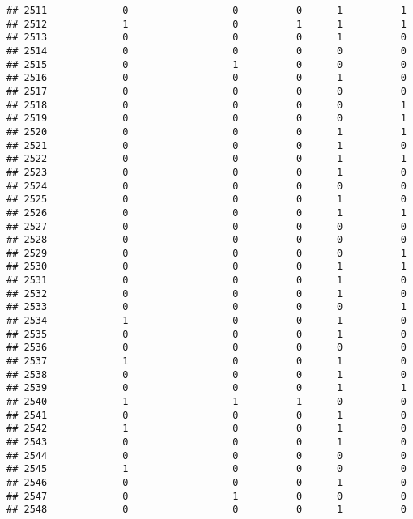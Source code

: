 \documentclass[
]{article}
\begin{document}
\begin{verbatim}
## 2511             0                  0          0      1          1
## 2512             1                  0          1      1          1
## 2513             0                  0          0      1          0
## 2514             0                  0          0      0          0
## 2515             0                  1          0      0          0
## 2516             0                  0          0      1          0
## 2517             0                  0          0      0          0
## 2518             0                  0          0      0          1
## 2519             0                  0          0      0          1
## 2520             0                  0          0      1          1
## 2521             0                  0          0      1          0
## 2522             0                  0          0      1          1
## 2523             0                  0          0      1          0
## 2524             0                  0          0      0          0
## 2525             0                  0          0      1          0
## 2526             0                  0          0      1          1
## 2527             0                  0          0      0          0
## 2528             0                  0          0      0          0
## 2529             0                  0          0      0          1
## 2530             0                  0          0      1          1
## 2531             0                  0          0      1          0
## 2532             0                  0          0      1          0
## 2533             0                  0          0      0          1
## 2534             1                  0          0      1          0
## 2535             0                  0          0      1          0
## 2536             0                  0          0      0          0
## 2537             1                  0          0      1          0
## 2538             0                  0          0      1          0
## 2539             0                  0          0      1          1
## 2540             1                  1          1      0          0
## 2541             0                  0          0      1          0
## 2542             1                  0          0      1          0
## 2543             0                  0          0      1          0
## 2544             0                  0          0      0          0
## 2545             1                  0          0      0          0
## 2546             0                  0          0      1          0
## 2547             0                  1          0      0          0
## 2548             0                  0          0      1          0

\end{verbatim}
\end{document}
